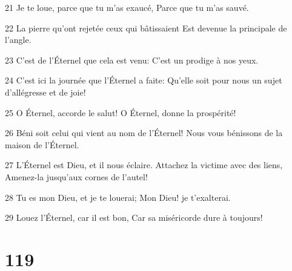 \par 21 Je te loue, parce que tu m'as exaucé, Parce que tu m'as sauvé.
\par 22 La pierre qu'ont rejetée ceux qui bâtissaient Est devenue la principale de l'angle.
\par 23 C'est de l'Éternel que cela est venu: C'est un prodige à nos yeux.
\par 24 C'est ici la journée que l'Éternel a faite: Qu'elle soit pour nous un sujet d'allégresse et de joie!
\par 25 O Éternel, accorde le salut! O Éternel, donne la prospérité!
\par 26 Béni soit celui qui vient au nom de l'Éternel! Nous vous bénissons de la maison de l'Éternel.
\par 27 L'Éternel est Dieu, et il nous éclaire. Attachez la victime avec des liens, Amenez-la jusqu'aux cornes de l'autel!
\par 28 Tu es mon Dieu, et je te louerai; Mon Dieu! je t'exalterai.
\par 29 Louez l'Éternel, car il est bon, Car sa miséricorde dure à toujours!

\chapter{119}

